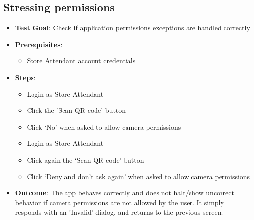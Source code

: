 \subsection{Stressing permissions}
\begin{itemize}
    \item \textbf{Test Goal}: Check if application permissions exceptions are handled correctly
    \item \textbf{Prerequisites}:
          \begin{itemize}
              \item Store Attendant account credentials
          \end{itemize}
    \item \textbf{Steps}:
          \begin{itemize}
              \item Login as Store Attendant
              \item Click the `Scan QR code' button
              \item Click `No' when asked to allow camera permissions
              \item Login as Store Attendant
              \item Click again the `Scan QR code' button
              \item Click `Deny and don't ask again' when asked to allow camera permissions
          \end{itemize}
    \item \textbf{Outcome}:  The app behaves correctly and does not halt/show uncorrect behavior if camera permissions are not allowed by the user. It simply responds with an 'Invalid' dialog, and returns to the previous screen.
\end{itemize}